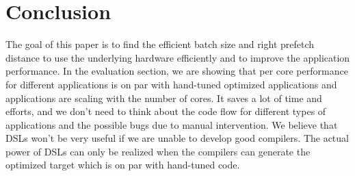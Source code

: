 \section{Conclusion}
\label{section6} 
The goal of this paper is to find the efficient batch size and right prefetch distance to use the underlying hardware efficiently and to improve the application performance. In the evaluation section, we are showing that per core performance for different applications is on par with hand-tuned optimized applications and applications are scaling with the number of cores. It saves a lot of time and efforts, and we don't need to think about the code flow for different types of applications and the possible bugs due to manual intervention. We believe that DSLs won't be very useful if we are unable to develop good compilers. The actual power of DSLs can only be realized when the compilers can generate the optimized target which is on par with hand-tuned code.